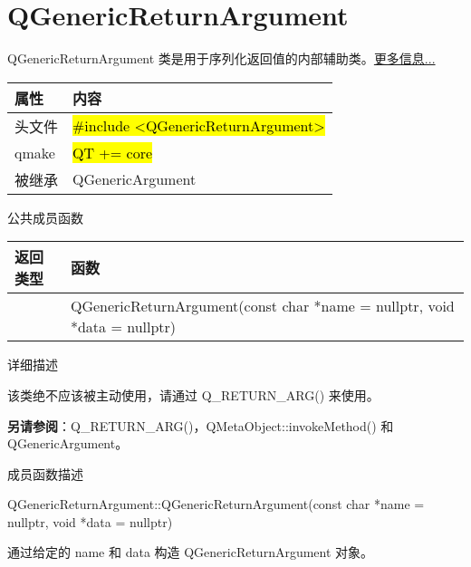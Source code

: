 \chapter{QGenericReturnArgument}

QGenericReturnArgument 类是用于序列化返回值的内部辅助类。\href{https://github.com/JackLovel/QtDocumentCN/blob/master/Src/G/QGenericReturnArgument/QGenericReturnArgument.md#%E8%AF%A6%E7%BB%86%E6%8F%8F%E8%BF%B0}{更多信息...}


\begin{tabular}{|l|l|}
\hline
属性& 	内容\\
\hline
头文件& 	\hl{\#include <QGenericReturnArgument>}\\
\hline
qmake& 	\hl{QT += core}\\
\hline
被继承& 	QGenericArgument\\
\hline
\end{tabular}


\splitLine

公共成员函数

\begin{tabular}{|l|m{30em}|}
\hline
返回类型& 	函数\\
\hline
 	&QGenericReturnArgument(const char *name = nullptr, void *data = nullptr)\\
\hline
\end{tabular}

\splitLine

详细描述

该类绝不应该被主动使用，请通过 Q\_RETURN\_ARG() 来使用。

\textbf{另请参阅}：Q\_RETURN\_ARG()，QMetaObject::invokeMethod() 和
QGenericArgument。

\splitLine

成员函数描述

QGenericReturnArgument::QGenericReturnArgument(const char *name = nullptr, void *data = nullptr)

通过给定的 name 和 data 构造 QGenericReturnArgument 对象。

